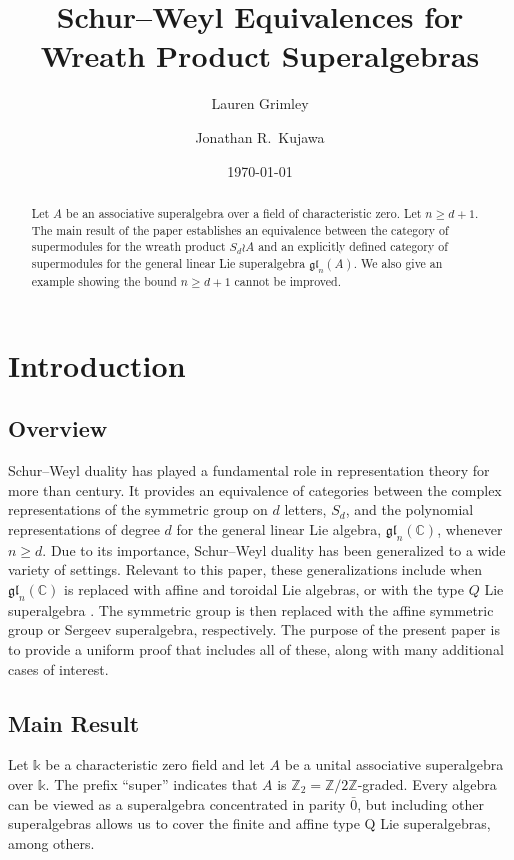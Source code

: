 \documentclass[11pt,reqno]{amsart} %
\title[Schur--Weyl Equivalences for Wreath Product Superalgebras]{Schur--Weyl Equivalences for Wreath Product Superalgebras}
\author{Lauren Grimley}
\author{Jonathan R.\  Kujawa}
\date{\today}
\newcommand{\C}{\mathbb{C}}
\newcommand{\Z}{\mathbb{Z}}
\newcommand{\gl}{\mathfrak{gl}}
\renewcommand{\k}{\mathds{k}}
\newcommand{\0}{\bar{0}}
\newcommand{\1}{\bar{1}}
\newcommand{\wreath}{\wr}
\newcommand{\SdwreathA}{S_{d} \wreath A}
\numberwithin{equation}{subsection}
\begin{document}
\begin{abstract} Let $A$ be an associative superalgebra over a field of characteristic zero.  Let $n \geq d+1$.  The main result of the paper establishes an equivalence between the category of supermodules for the wreath product $\SdwreathA$ and an explicitly defined category of supermodules for the general linear Lie superalgebra $\gl_{n}(A)$.  We also give an example showing the bound $n \geq d+1$ cannot be improved.
\end{abstract}




\maketitle



\section{Introduction}

\subsection{Overview} Schur--Weyl duality has played a fundamental role in representation theory for more than century.  It provides an equivalence of categories between the complex representations of the symmetric group on $d$ letters, $S_{d}$, and the polynomial representations of degree $d$ for the general linear Lie algebra, $\gl_{n}(\C)$, whenever $n \geq d$.  Due to its importance, Schur--Weyl duality has been generalized to a wide variety of settings.  Relevant to this paper, these generalizations include when $\gl_{n}(\C)$ is replaced with affine and toroidal Lie algebras, or with the type $Q$ Lie superalgebra \cite{Flicker,CGLMUW,Sergeev}.  The symmetric group is then replaced with the affine symmetric group or Sergeev superalgebra, respectively.  The purpose of the present paper is to provide a uniform proof that includes all of these, along with many additional cases of interest.

\subsection{Main Result}  Let $\k$ be a characteristic zero field and let $A$ be a unital associative superalgebra over $\k$.  The prefix ``super'' indicates that $A$ is $\Z_{2}= \Z /2\Z$-graded.  Every algebra can be viewed as a superalgebra concentrated in parity $\0$, but including other superalgebras allows us to cover the finite and affine type Q Lie superalgebras, among others.
\end{document}
